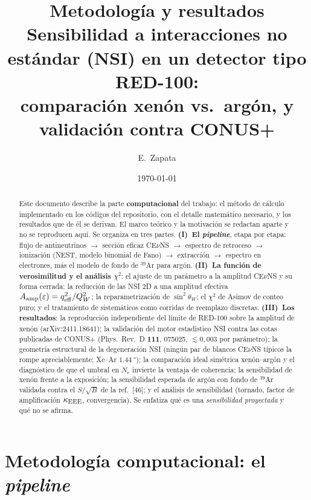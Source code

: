 \documentclass[11pt,a4paper]{article}
\title{\textbf{Metodolog\'ia y resultados}\\[2mm]
Sensibilidad a interacciones no est\'andar (NSI) en un detector tipo RED-100:\\
comparaci\'on xen\'on vs.\ arg\'on, y validaci\'on contra CONUS+}
\author{E.\ Zapata}
\date{\today}
\newcommand{\eps}{\varepsilon}
\newcommand{\QW}{Q_{W}}
\newcommand{\Ne}{N_{e}}
\newcommand{\qeff}{q_{\rm eff}}
\newcommand{\Aamp}{A_{\rm amp}}
\begin{document}
\maketitle

\begin{abstract}
\noindent
Este documento describe la parte \textbf{computacional} del trabajo: el m\'etodo
de c\'alculo implementado en los c\'odigos del repositorio, con el detalle
matem\'atico necesario, y los resultados que de \'el se derivan. El marco
te\'orico y la motivaci\'on se redactan aparte y no se reproducen aqu\'i. Se
organiza en tres partes. \textbf{(I)~El \emph{pipeline}}, etapa por etapa: flujo
de antineutrinos $\to$ secci\'on eficaz CE$\nu$NS $\to$ espectro de retroceso
$\to$ ionizaci\'on (NEST, modelo binomial de Fano) $\to$ extracci\'on $\to$
espectro en electrones, m\'as el modelo de fondo de $^{39}$Ar para arg\'on.
\textbf{(II)~La funci\'on de verosimilitud y el an\'alisis $\chi^{2}$}: el ajuste
de un par\'ametro a la amplitud CE$\nu$NS y su forma cerrada; la reducci\'on de
las NSI 2D a una amplitud efectiva $\Aamp(\eps)=\qeff^{2}/\QW^{2}$; la
reparametrizaci\'on de $\sin^{2}\theta_{W}$; el $\chi^{2}$ de Asimov de conteo
puro; y el tratamiento de sistem\'aticos como corridas de reemplazo discretas.
\textbf{(III)~Los resultados}: la reproducci\'on independiente del l\'imite de
RED-100 sobre la amplitud de xen\'on (arXiv:2411.18641); la validaci\'on del
motor estad\'istico NSI contra las cotas publicadas de CONUS+ (Phys.\ Rev.\ D
\textbf{111}, 075025, $\lesssim 0{,}003$ por par\'ametro); la geometr\'ia
estructural de la degeneraci\'on NSI (ning\'un par de blancos CE$\nu$NS t\'ipicos
la rompe apreciablemente; Xe--Ar $\SI{1.44}{\degree}$); la comparaci\'on ideal
sim\'etrica xen\'on--arg\'on y el diagn\'ostico de que el umbral en $\Ne$ invierte
la ventaja de coherencia; la sensibilidad de xen\'on frente a la exposici\'on; la
sensibilidad esperada de arg\'on con fondo de $^{39}$Ar validada contra el
$S/\sqrt{B}$ de la ref.\ {[46]}; y el an\'alisis de sensibilidad (tornado,
factor de amplificaci\'on $\kappa_{\rm EEE}$, convergencia). Se enfatiza qu\'e es
una \emph{sensibilidad proyectada} y qu\'e no se afirma.
\end{abstract}

\tableofcontents
\bigskip

\part{Metodolog\'ia computacional: el \emph{pipeline}}
\label{part:pipeline}
\end{document}
